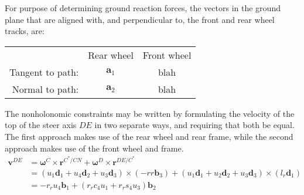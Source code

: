\documentclass[letterpaper,11pt]{article}
\newcommand{\bs}[1]{ \boldsymbol{ #1 } }
\begin{document}
For purpose of determining ground reaction forces, the vectors in the ground
plane that are aligned with, and perpendicular to, the front and rear wheel
tracks, are:

\begin{tabular}{rcc}
  & Rear wheel & Front wheel \\
  Tangent to path: & $\bs{a}_1$ & blah \\
  Normal to path: & $\bs{a}_2$ & blah
\end{tabular}



The nonholonomic constraints may be written by formulating the velocity of the
top of the steer axis $DE$ in two separate ways, and requiring that both be
equal.  The first approach makes use of the rear wheel and rear frame, while
the second approach makes use of the front wheel and frame.
\begin{align*}
  \bs{v}^{DE} & = \bs{\omega}^C \times \bs{r}^{C^* / CN} + \bs{\omega}^D
  \times \bs{r}^{DE / C^*} \\
  & = (u_1 \bs{d}_1 + u_4 \bs{d}_2 + u_3 \bs{d}_3) \times (-rr \bs{b}_3) + (u_1
  \bs{d}_1 + u_2 \bs{d}_2 + u_3 \bs{d}_3) \times (l_r \bs{d}_1) \\
  & = -r_r u_4 \bs{b}_1 + (r_r c_4 u_1 + r_r s_4 u_3) \bs{b}_2
\end{align*}



\end{document}
